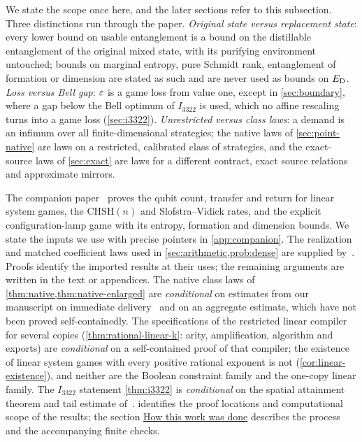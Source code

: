 We state the scope once here, and the later sections refer to this subsection. Three distinctions run through the paper.
\emph{Original state versus replacement state}: every lower bound on usable entanglement is a bound on the distillable
entanglement of the original mixed state, with its purifying environment untouched; bounds on marginal entropy, pure Schmidt
rank, entanglement of formation or dimension are stated as such and are never used as bounds on $E_{\mathrm D}$. \emph{Loss versus Bell
gap}: $\varepsilon$ is a game loss from value one, except in \cref{sec:boundary}, where a gap below the Bell optimum of $I_{3322}$ is
used, which no affine rescaling turns into a game loss (\cref{sec:i3322}). \emph{Unrestricted versus class laws}: a demand is an
infimum over all finite-dimensional strategies; the native laws of \cref{sec:point-native} are laws on a restricted, calibrated
class of strategies, and the exact-source laws of \cref{sec:exact} are laws for a different contract, exact source relations and
approximate mirrors.

The companion paper~\cite{DM-game} proves the qubit count, transfer and return for linear system games, the $\mathrm{CHSH}(n)$ and Slofstra--Vidick rates, and the explicit configuration-lamp game with its entropy, formation and dimension bounds. We state the inputs we use with precise pointers in \cref{app:companion}. The realization and matched coefficient laws used in \cref{sec:arithmetic,prob:dense} are supplied by~\cite[Theorem~1.1, Theorem~16.6 and Corollary~16.7]{DM-U3}. Proofs identify the imported results at their uses; the remaining arguments are written in the text or appendices. The native class laws of \cref{thm:native,thm:native-enlarged}
are \emph{conditional} on estimates from our manuscript on immediate delivery~\cite{DM-ID} and on an aggregate estimate, which have
not been proved self-containedly. The specifications of the restricted linear compiler for several copies
(\cref{thm:rational-linear-k}: arity, amplification, algorithm and exports) are \emph{conditional} on a self-contained proof of that
compiler; the existence of linear system games with every positive rational exponent is not (\cref{cor:linear-existence}), and
neither are the Boolean constraint family and the one-copy linear family. The $I_{3322}$ statement
\cref{thm:i3322} is \emph{conditional} on the spatial attainment theorem and tail estimate of~\cite{Dou26}.  identifies the proof locations and computational scope of the results; the section \hyperref[sec:methods]{How this work was done} describes the process and the accompanying finite checks.

